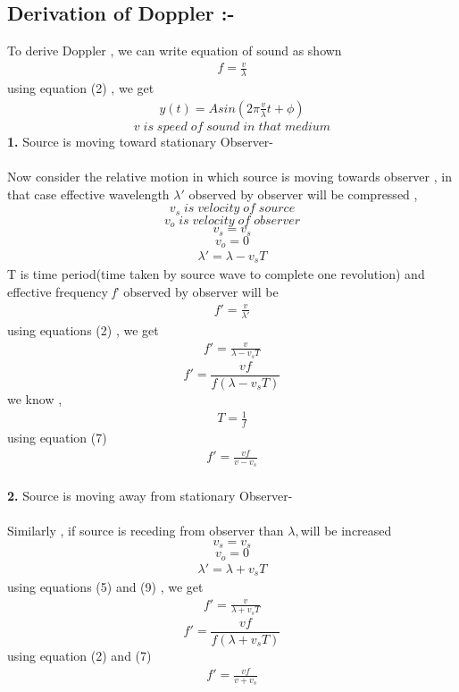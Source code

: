 \documentclass[journal,12pt,twocolumn]{IEEEtran}
\theoremstyle{remark}
\begin{document}
\subsection*{\textbf{Derivation \;of \;Doppler :-}}
To derive Doppler , we can write equation of sound as shown
\begin{align}f = \frac{v}{\lambda}\end{align}
using equation (2) , we get
\begin{align}y(t) = Asin( 2 \pi \frac{v}{\lambda}t + \phi ) \end{align}  
$$v \;is\; speed\; of\; sound\; in\; that\; medium$$
\textbf{1.} Source is moving toward stationary Observer-\\\\
Now consider the relative motion in which source is moving towards observer , in that case effective wavelength $\lambda'$ observed by observer will be compressed ,
$$v_s \;is\; velocity\; of\; source$$
$$v_o \;is\; velocity\; of\;observer $$
$$v_s = v_s$$
$$v_o = 0$$
\begin{align}\lambda' = \lambda - v_s T\end{align}
T is time period(time taken by source wave to complete one revolution)
and effective frequency \textit{f}' observed by observer will be
\begin{align}f' = \frac{v}{\lambda'}\end{align}
using equations (2) , we get
\begin{align}f' = \frac{v}{\lambda- v_s T}\end{align}
$$f' = \frac{v f}{f(\lambda- v_s T)}$$
we know ,
\begin{align}T = \frac{1}{f}\end{align}
using equation (7)
\begin{align}f' = \frac{v f}{v- v_s }\end{align}
\bigskip\\
\textbf{2.} Source is moving away from stationary Observer-\\\\
Similarly , if source is receding from observer than $\lambda, $will be increased
$$v_s = v_s$$
$$v_o = 0$$
\begin{align}\lambda' = \lambda + v_s T\end{align}
using equations (5) and (9) , we get
\begin{align}f' = \frac{v}{\lambda+ v_s T}\end{align}
$$f' = \frac{v f}{f(\lambda+v_s T)}$$
using equation (2) and (7)
\begin{align}f' = \frac{v f}{v+ v_s }\end{align}
\end{document}
